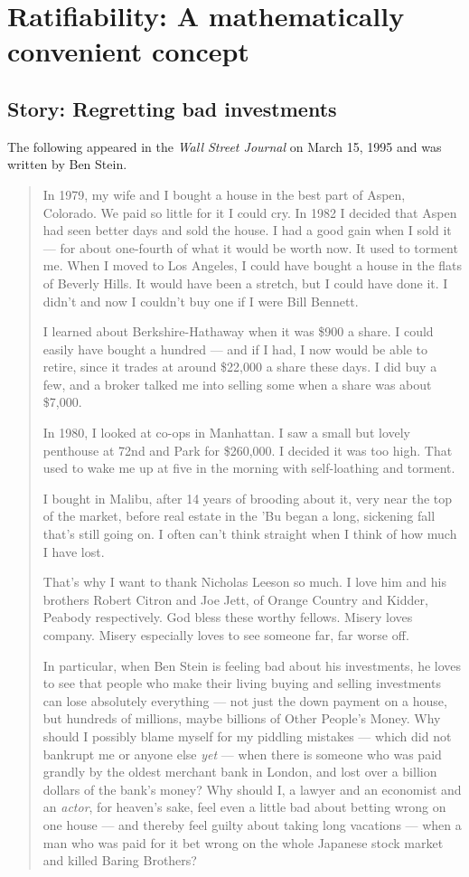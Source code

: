 \documentclass{book}
\begin{document}
    \section[Ratifiability]{Ratifiability: A mathematically convenient concept}
        \subsection{Story: Regretting bad investments}
%
The following appeared in the {\it Wall Street Journal} on March 15,
1995 and was written by Ben Stein.
\begin{quote}
{\small

  In 1979, my wife and I bought a house in the best part of Aspen,
  Colorado.  We paid so little for it I could cry.  In 1982 I decided that
  Aspen had seen better days and sold the house.  I had a good gain
  when I sold it --- for about one-fourth of what it would be worth now.
  It used to torment me.  When I moved to Los Angeles, I could have
  bought a house in the flats of Beverly Hills.  It would have been a
  stretch, but I could have done it.  I didn't and now I couldn't buy
  one if I were Bill Bennett.

I learned about Berkshire-Hathaway when it was \$900 a share.  I could
easily have bought a hundred --- and if I had, I now would be able to
retire, since it trades at around \$22,000 a share these days.  I did
buy a few, and a broker talked me into selling some when a share was
about \$7,000.

In 1980, I looked at co-ops in Manhattan.  I saw a small but lovely
penthouse at 72nd and Park for \$260,000.  I decided it was too high.
That used to wake me up at five in the morning with self-loathing and
torment.  

I bought in Malibu, after 14 years of brooding about it, very near the
top of the market, before real estate in the 'Bu began a long,
sickening fall that's still going on.  I often can't think straight
when I think of how much I have lost.  

That's why I want to thank Nicholas Leeson so much.  I love him and
his brothers Robert Citron and Joe Jett, of Orange Country and
Kidder, Peabody respectively.  God bless these worthy fellows.  Misery
loves company.  Misery especially loves to see someone far, far worse
off. 

In particular, when Ben Stein is feeling bad about his investments, he
loves to see that people who make their living buying and selling
investments can lose absolutely everything --- not just the down payment
on a house, but hundreds of millions, maybe billions of Other People's
Money.  Why should I possibly blame myself for my piddling
mistakes --- which did not bankrupt me or anyone else {\it yet} --- when
there is someone who was paid grandly by the oldest merchant bank in
London, and lost over a billion dollars of the bank's money?  Why
should I, a lawyer and an economist and an {\em actor}, for heaven's
sake, feel even a little bad about betting wrong on one house --- and
thereby feel guilty about taking long vacations --- when a man who was
paid for it bet wrong on the whole Japanese stock market and killed
Baring Brothers?

}
\end{quote}
\end{document}
